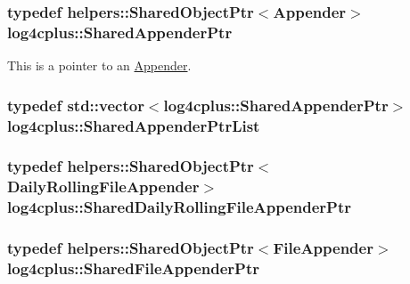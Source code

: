 \hypertarget{namespacelog4cplus_a12d841b842c72396be9219ce67a0c215}{
\subsubsection[{Shared\-Appender\-Ptr}]{\setlength{\rightskip}{0pt plus 5cm}typedef {\bf helpers\-::\-Shared\-Object\-Ptr}$<${\bf Appender}$>$ {\bf log4cplus\-::\-Shared\-Appender\-Ptr}}}\label{namespacelog4cplus_a12d841b842c72396be9219ce67a0c215}
This is a pointer to an \hyperlink{classlog4cplus_1_1Appender}{Appender}. \hypertarget{namespacelog4cplus_a97158ac12736f649c5477d7b63f51ede}{
\subsubsection[{Shared\-Appender\-Ptr\-List}]{\setlength{\rightskip}{0pt plus 5cm}typedef std\-::vector$<${\bf log4cplus\-::\-Shared\-Appender\-Ptr}$>$ {\bf log4cplus\-::\-Shared\-Appender\-Ptr\-List}}}\label{namespacelog4cplus_a97158ac12736f649c5477d7b63f51ede}
\hypertarget{namespacelog4cplus_a2a06b80823a63d74c784b75f494853ed}{
\subsubsection[{Shared\-Daily\-Rolling\-File\-Appender\-Ptr}]{\setlength{\rightskip}{0pt plus 5cm}typedef {\bf helpers\-::\-Shared\-Object\-Ptr}$<${\bf Daily\-Rolling\-File\-Appender}$>$ {\bf log4cplus\-::\-Shared\-Daily\-Rolling\-File\-Appender\-Ptr}}}\label{namespacelog4cplus_a2a06b80823a63d74c784b75f494853ed}
\hypertarget{namespacelog4cplus_a9eb9b1a5e546194d616f5efca5f00de7}{
\subsubsection[{Shared\-File\-Appender\-Ptr}]{\setlength{\rightskip}{0pt plus 5cm}typedef {\bf helpers\-::\-Shared\-Object\-Ptr}$<${\bf File\-Appender}$>$ {\bf log4cplus\-::\-Shared\-File\-Appender\-Ptr}}}\label{namespacelog4cplus_a9eb9b1a5e546194d616f5efca5f00de7}

